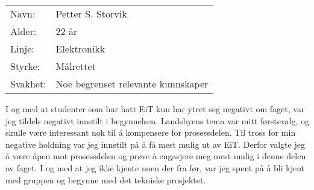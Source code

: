 \begin{table}[H]
    \begin{tabular}{l l}
        Navn: & Petter S. Storvik \\
        Alder: & 22 år \\ 
        Linje: & Elektronikk \\
        Styrke: & Målrettet \\
        Svakhet: & Noe begrenset relevante kunnskaper
    \end{tabular}
\end{table}

I og med at studenter som har hatt EiT kun har ytret seg negativt om faget, var jeg tildels negativt innstilt i begynnelsen. 
Landsbyens tema var mitt førstevalg, og skulle være interessant nok til å kompensere for prosessdelen. 
Til tross for min negative holdning var jeg innstilt på å få mest mulig ut av EiT.
Derfor valgte jeg å være åpen mot prosessdelen og prøve å engasjere meg mest mulig i denne delen av faget. 
I og med at jeg ikke kjente noen der fra før, var jeg spent på å bli kjent med gruppen og begynne med det tekniske prosjektet. 

